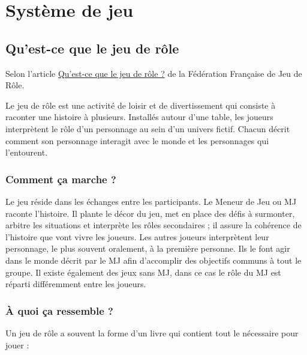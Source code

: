 \chapter{Système de jeu}
\newpage

\section{Qu'est-ce que le jeu de rôle}

Selon l'article \href{http://www.ffjdr.org/quest-ce-que-le-jeu-de-role/}{Qu’est-ce que le jeu de rôle ?} de la Fédération Française de Jeu de Rôle.

Le jeu de rôle est une activité de loisir et de divertissement qui consiste à raconter une histoire à plusieurs. Installés autour d’une table, les joueurs interprètent le rôle d’un personnage au sein d’un univers fictif. Chacun décrit comment son personnage interagit avec le monde et les personnages qui l’entourent.

\subsection*{Comment ça marche ?}

Le jeu réside dans les échanges entre les participants. Le Meneur de Jeu ou MJ raconte l’histoire. Il plante le décor du jeu, met en place des défis à surmonter, arbitre les situations et interprète les rôles secondaires ; il assure la cohérence de l’histoire que vont vivre les joueurs. Les autres joueurs interprètent leur personnage, le plus souvent oralement, à la première personne. Ils le font agir dans le monde décrit par le MJ afin d’accomplir des objectifs communs à tout le groupe. Il existe également des jeux sans MJ, dans ce cas le rôle du MJ est réparti différemment entre les joueurs.

\subsection*{À quoi ça ressemble ?}

Un jeu de rôle a souvent la forme d’un livre qui contient tout le nécessaire pour jouer :

